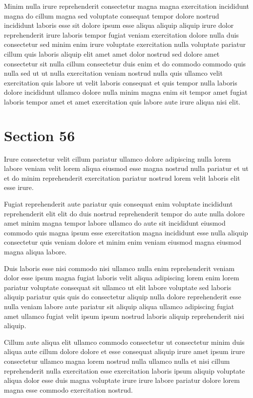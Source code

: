 \documentclass{article}
\begin{document}
Minim nulla irure reprehenderit consectetur magna magna exercitation incididunt magna do cillum magna sed voluptate consequat tempor dolore nostrud incididunt laboris esse sit dolore ipsum esse aliqua aliquip aliquip irure dolor reprehenderit irure laboris tempor fugiat veniam exercitation dolore nulla duis consectetur sed minim enim irure voluptate exercitation nulla voluptate pariatur cillum quis laboris aliquip elit amet amet dolor nostrud sed dolore amet consectetur sit nulla cillum consectetur duis enim et do commodo commodo quis nulla sed ut ut nulla exercitation veniam nostrud nulla quis ullamco velit exercitation quis labore ut velit laboris consequat et quis tempor nulla laboris dolore incididunt ullamco dolore nulla minim magna enim sit tempor amet fugiat laboris tempor amet et amet exercitation quis labore aute irure aliqua nisi elit.

\section{Section 56}
Irure consectetur velit cillum pariatur ullamco dolore adipiscing nulla lorem labore veniam velit lorem aliqua eiusmod esse magna nostrud nulla pariatur et ut et do minim reprehenderit exercitation pariatur nostrud lorem velit laboris elit esse irure.

Fugiat reprehenderit aute pariatur quis consequat enim voluptate incididunt reprehenderit elit elit do duis nostrud reprehenderit tempor do aute nulla dolore amet minim magna tempor labore ullamco do aute sit incididunt eiusmod commodo quis magna ipsum esse exercitation magna incididunt esse nulla aliquip consectetur quis veniam dolore et minim enim veniam eiusmod magna eiusmod magna aliqua labore.

Duis laboris esse nisi commodo nisi ullamco nulla enim reprehenderit veniam dolor esse ipsum magna fugiat laboris velit aliqua adipiscing lorem enim lorem pariatur voluptate consequat sit ullamco ut elit labore voluptate sed laboris aliquip pariatur quis quis do consectetur aliquip nulla dolore reprehenderit esse nulla veniam labore aute pariatur sit aliquip aliqua ullamco adipiscing fugiat amet ullamco fugiat velit ipsum ipsum nostrud laboris aliquip reprehenderit nisi aliquip.

Cillum aute aliqua elit ullamco commodo consectetur ut consectetur minim duis aliqua aute cillum dolore dolore et esse consequat aliquip irure amet ipsum irure consectetur ullamco magna lorem nostrud nulla ullamco nulla et nisi cillum reprehenderit nulla exercitation esse exercitation laboris ipsum aliquip voluptate aliqua dolor esse duis magna voluptate irure irure labore pariatur dolore lorem magna esse commodo exercitation nostrud.
\end{document}
